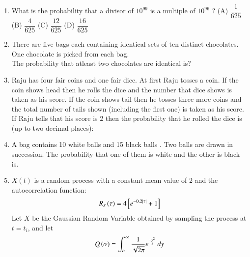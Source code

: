\documentclass[journal,12pt,twocolumn]{IEEEtran}
\begin{document}
\begin{enumerate}
(A) 0\\
(B) $\frac{1}{6}$\\
(C) $\frac{1}{3}$\\
(D) $\frac{1}{12}$
%
%
\item What is the probability that a divisor of $10^{99}$ is a multiple of $10^{96}$ ?
\vspace{0.5 cm}
(A) $\dfrac{1}{625}$ \hspace{0.5 cm} (B) $\dfrac{4}{625}$ \hspace{0.5 cm} (C) $\dfrac{12}{625}$ \hspace{0.5 cm} (D) $\dfrac{16}{625}$
%
\\
\solution

%
\item There are five bags each containing identical sets of ten distinct chocolates. One chocolate is picked from each bag.\\
The probability that atleast two chocolates are identical is?\\
\solution

%
\item Raju has four fair coins and one fair dice. At first Raju tosses a coin. If the coin shows head then he rolls the dice and the number that dice shows is taken as his score. If the coin shows tail then he tosses three more coins and the total number of tails shown (including the first one) is taken as his score. If Raju tells that his score is 2 then the probability that he rolled the dice is (up to two decimal places):
%
\\
\solution

%
\item A bag contains 10 white balls and 15 black balls . Two balls are drawn in succession. The probability that one of them is white and the other is black is.
\\
\solution

%
\item $X(t)$ is a random process with a constant mean value of 2 and the autocorrelation function:
\begin{align}
    R_x\brak{\tau} = 4\sbrak{e^{-0.2|\tau|} + 1}
    \label{autocorrelation}
\end{align}
Let $X$ be the Gaussian Random Variable obtained by sampling the process at $t = t_i$, and let 
\begin{align}
    Q\brak{\alpha} = \int_{\alpha}^{\infty} \frac{1}{\sqrt{2\pi}} e^{\frac{-y^2}{2}}\,dy
    \label{Q}

\end{align}
\end{enumerate}
\end{document}
